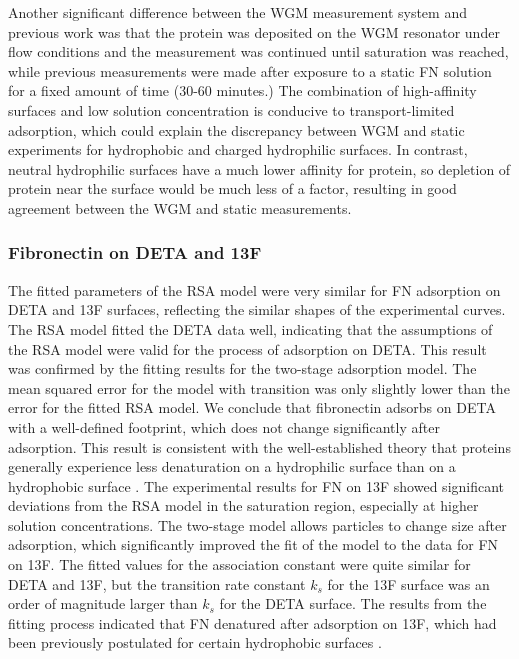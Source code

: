 Another significant difference between the WGM measurement system
and previous work was that the protein was deposited on the WGM resonator
under flow conditions and the measurement was continued until saturation
was reached, while previous measurements were made after exposure
to a static FN solution for a fixed amount of time (30-60 minutes.)
The combination of high-affinity surfaces and low solution concentration
is conducive to transport-limited adsorption, which could explain
the discrepancy between WGM and static experiments for hydrophobic
and charged hydrophilic surfaces. In contrast, neutral hydrophilic
surfaces have a much lower affinity for protein, so depletion of protein
near the surface would be much less of a factor, resulting in good
agreement between the WGM and static measurements. 


\subsubsection{Fibronectin on DETA and 13F}

The fitted parameters of the RSA model were very similar for FN adsorption
on DETA and 13F surfaces, reflecting the similar shapes of the experimental
curves. The RSA model fitted the DETA data well, indicating that the
assumptions of the RSA model were valid for the process of adsorption
on DETA. This result was confirmed by the fitting results for the
two-stage adsorption model. The mean squared error for the model with
transition was only slightly lower than the error for the fitted RSA
model. We conclude that fibronectin adsorbs on DETA with a well-defined
footprint, which does not change significantly after adsorption. This
result is consistent with the well-established theory that proteins
generally experience less denaturation on a hydrophilic surface than
on a hydrophobic surface \cite{Latour2005}. The experimental results
for FN on 13F showed significant deviations from the RSA model in
the saturation region, especially at higher solution concentrations.
The two-stage model allows particles to change size after adsorption,
which significantly improved the fit of the model to the data for
FN on 13F. The fitted values for the association constant were quite
similar for DETA and 13F, but the transition rate constant $k_{s}$
for the 13F surface was an order of magnitude larger than $k_{s}$
for the DETA surface. The results from the fitting process indicated
that FN denatured after adsorption on 13F, which had been previously
postulated for certain hydrophobic surfaces \cite{Lan2005,Sivaraman2009}. 


